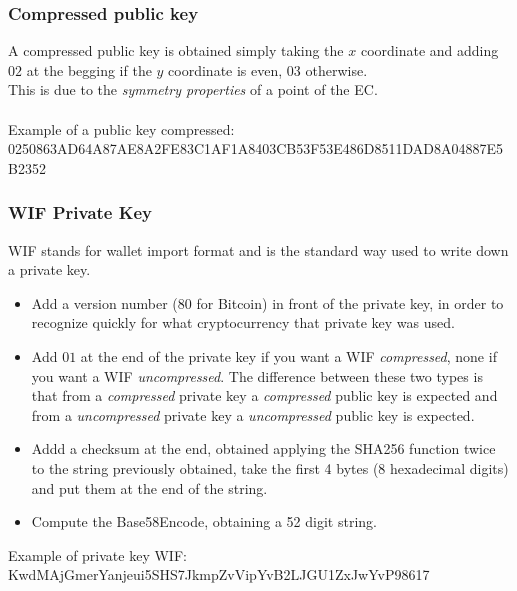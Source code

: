 \subsubsection{Compressed public key}
A compressed public key is obtained simply taking the $x$ coordinate and adding $02$ at the begging if the $y$ coordinate is even, $03$ otherwise. \\
This is due to the \textit{symmetry properties} of a point of the EC.
\\ \\
Example of a public key compressed:\\
0250863AD64A87AE8A2FE83C1AF1A8403CB53F53E486D8511DAD8A04887E5B2352


\subsubsection{WIF Private Key}
WIF stands for wallet import format and is the standard way used to write down a private key.
\begin{itemize}
	\item Add a version number ($80$ for Bitcoin) in front of the private key, in order to recognize quickly for what cryptocurrency that private key was used.
	\item Add $01$ at the end of the private key if you want a WIF \textit{compressed}, none if you want a WIF \textit{uncompressed}. The difference between these two types is that from a \textit{compressed} private key a \textit{compressed} public key is expected and from a \textit{uncompressed} private key a \textit{uncompressed} public key is expected.
	\item Addd a checksum at the end, obtained applying the SHA256 function twice to the string previously obtained, take the first 4 bytes (8 hexadecimal digits) and put them at the end of the string.
	\item Compute the Base58Encode, obtaining a 52 digit string.
\end{itemize}
Example of private key WIF: \\ KwdMAjGmerYanjeui5SHS7JkmpZvVipYvB2LJGU1ZxJwYvP98617

